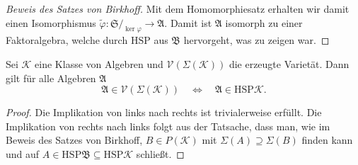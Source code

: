 \begin{proof}[Beweis des Satzes von Birkhoff]
    Mit dem Homomorphiesatz erhalten wir damit einen Isomorphismus $\tilde{\varphi} : \mathfrak{S} /_{\ker \varphi} \to \mathfrak{A}$. Damit ist $\mathfrak{A}$ isomorph zu einer Faktoralgebra, welche durch $\mathrm{HSP}$ aus $\mathfrak{B}$ hervorgeht, was zu zeigen war.
\end{proof}

\begin{corollary}
    Sei $\mathcal{K}$ eine Klasse von Algebren und $\mathcal{V}(\Sigma(\mathcal{K}))$ die erzeugte Varietät. Dann gilt für alle Algebren $\mathfrak{A}$
    $$ \mathfrak{A} \in \mathcal{V}(\Sigma(\mathcal{K})) \quad \Leftrightarrow \quad \mathfrak{A} \in \mathrm{HSP}\mathcal{K}. $$
\end{corollary}

\begin{proof}
    Die Implikation von links nach rechts ist trivialerweise erfüllt. Die Implikation von rechts nach links folgt aus der Tatsache, dass man, wie im Beweis des Satzes von Birkhoff, $B\in P(\mathcal{K})$ mit $\Sigma(A)\supseteq\Sigma(B)$ finden kann und auf $A\in \mathrm{HSP}\mathfrak{B}\subseteq \mathrm{HSP}\mathcal{K}$ schließt.
\end{proof}